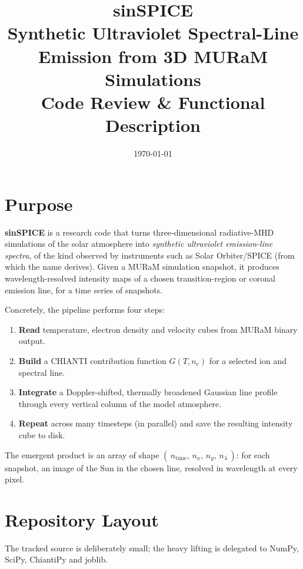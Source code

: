 \documentclass[11pt]{article}
\title{\vspace{-1.5em}\textbf{\color{accent}sinSPICE}\\[2pt]
\large Synthetic Ultraviolet Spectral-Line Emission from 3D MURaM Simulations\\[4pt]
\normalsize Code Review \& Functional Description}
\author{}
\date{\today}
\begin{document}
\maketitle
\vspace{-3em}

\section{Purpose}

\textbf{sinSPICE} is a research code that turns three-dimensional radiative-MHD
simulations of the solar atmosphere into \emph{synthetic ultraviolet emission-line
spectra}, of the kind observed by instruments such as Solar Orbiter/SPICE (from
which the name derives). Given a MURaM simulation snapshot, it produces
wavelength-resolved intensity maps of a chosen transition-region or coronal
emission line, for a time series of snapshots.

Concretely, the pipeline performs four steps:

\begin{enumerate}[nosep,leftmargin=1.4em]
  \item \textbf{Read} temperature, electron density and velocity cubes from
        MURaM binary output.
  \item \textbf{Build} a CHIANTI contribution function $G(T,n_e)$ for a
        selected ion and spectral line.
  \item \textbf{Integrate} a Doppler-shifted, thermally broadened Gaussian line
        profile through every vertical column of the model atmosphere.
  \item \textbf{Repeat} across many timesteps (in parallel) and save the
        resulting intensity cube to disk.
\end{enumerate}

The emergent product is an array of shape
$(\,n_{\text{time}},\, n_x,\, n_y,\, n_\lambda\,)$: for each snapshot, an image of
the Sun in the chosen line, resolved in wavelength at every pixel.

\section{Repository Layout}

The tracked source is deliberately small; the heavy lifting is delegated to
NumPy, SciPy, ChiantiPy and joblib.
\end{document}
